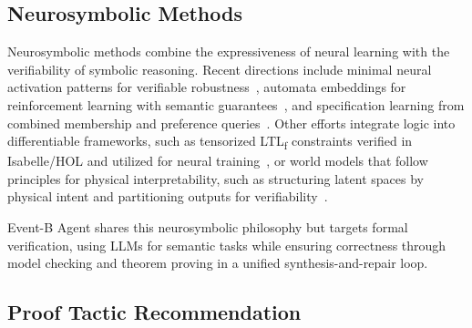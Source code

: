 
\subsection{Neurosymbolic Methods}
Neurosymbolic methods \cite{chaudhuri2021neurosymbolic} combine the expressiveness of neural learning with the verifiability of symbolic reasoning.
Recent directions include minimal neural activation patterns for verifiable robustness~\cite{geng2024learning}, automata embeddings for reinforcement learning with semantic guarantees~\cite{yalcinkaya2025provably}, and specification learning from combined membership and preference queries~\cite{shah2023learning}.
Other efforts integrate logic into differentiable frameworks, such as tensorized LTL\textsubscript{f} constraints verified in Isabelle/HOL and utilized for neural training~\cite{chevallier2025formally}, or world models that follow principles for physical interpretability, such as structuring latent spaces by physical intent and partitioning outputs for verifiability~\cite{peper2025four}.

Event-B Agent shares this neurosymbolic philosophy but targets formal verification, using LLMs for semantic tasks while ensuring correctness through model checking and theorem proving in a unified synthesis-and-repair loop.

\subsection{Proof Tactic Recommendation}

